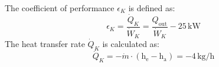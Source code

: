 The coefficient of performance \( \epsilon_K \) is defined as:  
\[
\epsilon_K = \frac{\dot{Q}_K}{\dot{W}_K} = \frac{Q_{\text{out}}}{\dot{W}_K} - 25 \, \text{kW}
\]  
The heat transfer rate \( \dot{Q}_K \) is calculated as:  
\[
\dot{Q}_K = -\dot{m} \cdot (\text{h}_{\text{e}} - \text{h}_{\text{a}}) = -4 \, \text{kg/h}
\]